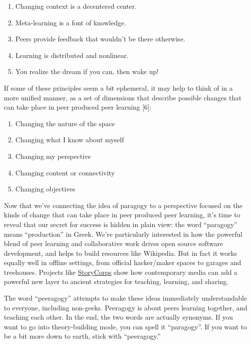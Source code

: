 \begin{enumerate}
\itemsep1pt\parskip0pt
\item
  Changing context is a decentered center.
\item
  Meta-learning is a font of knowledge.
\item
  Peers provide feedback that wouldn't be there otherwise.
\item
  Learning is distributed and nonlinear.
\item
  You realize the dream if you can, then wake up!
\end{enumerate}

If some of these principles seem a bit ephemeral, it may help to think
of in a more unified manner, as a set of dimensions that describe
possible changes that can take place in peer produced peer learning
{[}6{]}:

\begin{enumerate}
\itemsep1pt\parskip0pt
\item
  Changing the nature of the space
\item
  Changing what I know about myself
\item
  Changing my perspective
\item
  Changing content or connectivity
\item
  Changing objectives
\end{enumerate}

Now that we've connecting the idea of paragogy to a perspective focused
on the kinds of change that can take place in peer produced peer
learning, it's time to reveal that our secret for success is hidden in
plain view: the word ``paragogy'' means ``production'' in Greek. We're
particularly interested in how the powerful blend of peer learning and
collaborative work drives open source software development, and helps to
build resources like Wikipedia. But in fact it works equally well in
offline settings, from official hacker/maker spaces to garages and
treehouses. Projects like
\href{http://storycorps.org/about/}{StoryCorps} show how contemporary
media can add a powerful new layer to ancient strategies for teaching,
learning, and sharing.

The word ``peeragogy'' attempts to make these ideas immediately
understandable to everyone, including non-geeks. Peeragogy is about
peers learning together, and teaching each other. In the end, the two
words are actually synonyms. If you want to go into theory-building
mode, you can spell it ``paragogy''. If you want to be a bit more down
to earth, stick with ``peeragogy.''

